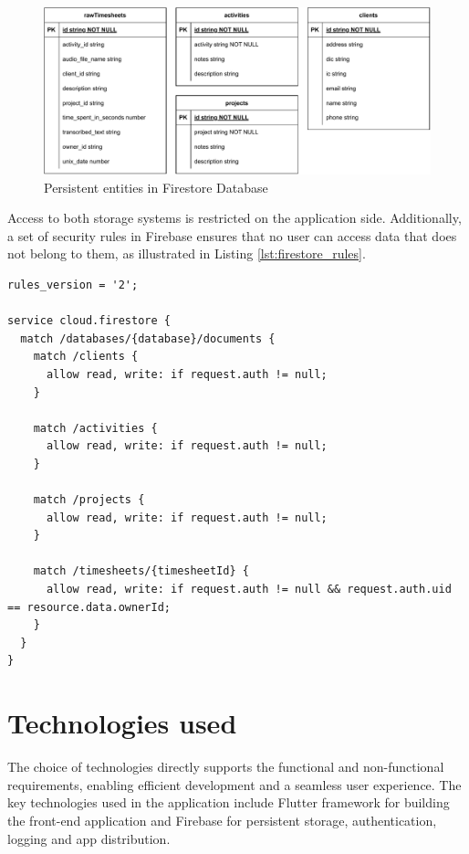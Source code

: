 \documentclass[
  digital,     %
  oneside,     %
  nosansbold,  %
  nocolorbold, %
  lof,         %
  lot,         %
]{fithesis4}
\begin{document}
\begin{figure}[!t]
    \centering
    \includegraphics[width=\textwidth]{assets/diagrams/entity-relationship-diagram.drawio.pdf}
    \caption{Persistent entities in Firestore Database}
    \label{fig:entity_diagram}
\end{figure}

Access to both storage systems is restricted on the application side. Additionally, a set of security rules in Firebase ensures that no user can access data that does not belong to them, as illustrated in Listing \ref{lst:firestore_rules}.

\newpage
\begin{lstlisting}[language=Firestore, caption={Firestore Security Rules}, label={lst:firestore_rules}, floatplacement=H, showstringspaces=false, showstringspaces=false]
rules_version = '2';

service cloud.firestore {
  match /databases/{database}/documents {
	match /clients {
      allow read, write: if request.auth != null;
    }
    
    match /activities {
      allow read, write: if request.auth != null;
    }
    
    match /projects {
      allow read, write: if request.auth != null;
    }

    match /timesheets/{timesheetId} {
      allow read, write: if request.auth != null && request.auth.uid == resource.data.ownerId;
    }
  }
}
\end{lstlisting}

\chapter{Technologies used}
The choice of technologies directly supports the functional and non-functional requirements, enabling efficient development and a seamless user experience. The key technologies used in the application include Flutter framework for building the front-end application and Firebase for persistent storage, authentication, logging and app distribution.
\end{document}

